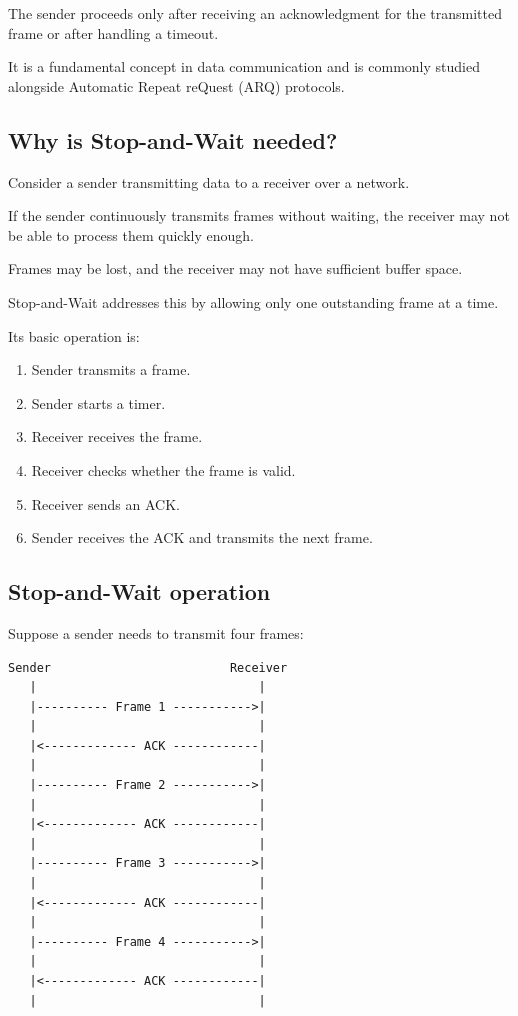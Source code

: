 The sender proceeds only after receiving an acknowledgment for the transmitted frame or after handling a timeout.

It is a fundamental concept in data communication and is commonly studied alongside Automatic Repeat reQuest (ARQ) protocols.

\subsection{Why is Stop-and-Wait needed?}

Consider a sender transmitting data to a receiver over a network.

If the sender continuously transmits frames without waiting, the receiver may not be able to process them quickly enough.

Frames may be lost, and the receiver may not have sufficient buffer space.

Stop-and-Wait addresses this by allowing only one outstanding frame at a time.

Its basic operation is:

\begin{enumerate}
\item Sender transmits a frame.
\item Sender starts a timer.
\item Receiver receives the frame.
\item Receiver checks whether the frame is valid.
\item Receiver sends an ACK.
\item Sender receives the ACK and transmits the next frame.
\end{enumerate}

\subsection{Stop-and-Wait operation}

Suppose a sender needs to transmit four frames:

\begin{lstlisting}
Sender                         Receiver
   |                               |
   |---------- Frame 1 ----------->|
   |                               |
   |<------------- ACK ------------|
   |                               |
   |---------- Frame 2 ----------->|
   |                               |
   |<------------- ACK ------------|
   |                               |
   |---------- Frame 3 ----------->|
   |                               |
   |<------------- ACK ------------|
   |                               |
   |---------- Frame 4 ----------->|
   |                               |
   |<------------- ACK ------------|
   |                               |
\end{lstlisting}

